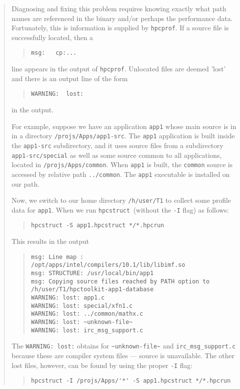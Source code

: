 \documentclass{article}
\newcommand{\hpcstruct}{\texttt{hpcstruct}}
\newcommand{\hpcprof}{\texttt{hpcprof}}
\begin{document}
\begin{quote}
Diagnosing and fixing this problem requires knowing exactly what path
names are referenced in the binary and/or perhaps the performance
data. Fortunately, this is information is supplied by \hpcprof .
If a source file is successfully located, then a 
\begin{quote}
\verb|msg:   cp:...|
\end{quote}
line appears in the output of \hpcprof . Unlocated files are deemed 'lost'
and there is an output line of the form 
\begin{quote}
\verb|WARNING:  lost:|
\end{quote}
in the output.

For example, suppose we have an application \verb|app1| whose main source 
is in in a directory \verb|/projs/Apps/app1-src|. The \verb|app1|
application is built inside the \verb|app1-src| subdirectory, and it uses
source files from a subdirectory \verb|app1-src/special| as well as some
source common to all applications, located in
\verb|/projs/Apps/common|. When \verb|app1| is built, the
\verb|common| source is accessed by relative path \verb|../common|.
The \verb|app1| executable is installed on our path.

Now, we switch to our home directory \verb|/h/user/T1| to collect
some profile data for \verb|app1|.
When we run \hpcstruct\ (without the \verb|-I| flag) as follows:
\begin{quote}
  \verb|hpcstruct -S app1.hpcstruct */*.hpcrun|
\end{quote}
This results in the output
\begin{quote}
\begin{Verbatim}[fontsize=\small]
msg: Line map : /opt/apps/intel/compilers/10.1/lib/libimf.so
msg: STRUCTURE: /usr/local/bin/app1
msg: Copying source files reached by PATH option to /h/user/T1/hpctoolkit-app1-database
WARNING: lost: app1.c
WARNING: lost: special/xfn1.c
WARNING: lost: ../common/mathx.c
WARNING: lost: ~unknown-file~
WARNING: lost: irc_msg_support.c
\end{Verbatim}
\end{quote}
The \verb|WARNING: lost:| obtains for \verb|~unknown-file~| and
\verb|irc_msg_support.c| because these are compiler system files --- source
is unavailable. The other lost files, however, can be found by using
the proper \verb|-I| flag:
\begin{quote}
\begin{verbatim}
hpcstruct -I /projs/Apps/'*' -S app1.hpcstruct */*.hpcrun
\end{verbatim}
\end{quote}


\end{quote}
\end{document}
